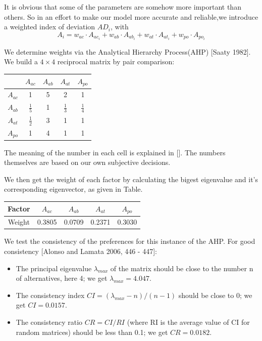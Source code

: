 \documentclass[12pt,a4paper,titlepage]{article}
\begin{document}
It is obvious that some of the parameters are somehow more important
than others. So in an effort to make our model more accurate and
reliable,we introduce a weighted index of deviation $AD_i$, with
\begin{equation}
  A_i=w_{ac} \cdot A_{ac_i} + w_{ab} \cdot A_{ab_i} + w_{at} \cdot A_{at_i} +
  w_{po} \cdot A_{po_i}
\end{equation}

We determine weights via the Analytical Hierarchy Process(AHP) [Saaty
1982]. We build a $4 \times 4$ reciprocal matrix by pair comparison:
\begin{center}
\begin{tabular}{|c|c|c|c|c|}
\hline
       &$A_{ac}$      &$A_{ab}$  &$A_{at}$    &$A_{po}$  \\ \hline
 $A_{ac}$ & 1           & 5 & 2            &1            \\ \hline
 $A_{ab}$ &$\frac{1}{5}$ & 1 &$\frac{1}{3}$ & $\frac{1}{4}$\\ \hline
 $A_{at}$ &$\frac{1}{2}$ & 3 & 1            &1            \\ \hline
 $A_{po}$ &1            & 4 & 1            &1            \\ \hline
\end{tabular}
\end{center}

The meaning of the number in each cell is explained in []. The numbers
themselves are based on our own subjective decisions.

We then get the weight of each factor by calculating the bigest
eigenvalue and it's corresponding eigenvector, as given in Table.

\begin{center}
\begin{tabular}{c|cccc}
  Factor  &$A_{ac}$    &$A_{ab}$   &$A_{at}$    &$A_{po}$\\ \hline
  Weight  &0.3805  &0.0709  &0.2371  &0.3030\\
\end{tabular}
\end{center}

We test the consistency of the preferences for this instance of the
AHP. For good consistency [Alonso and Lamata 2006, 446 - 447]:

\begin{itemize}
\item The principal eigenvalue $\lambda_{max}$ of the matrix should be
  close to the number n of alternatives, here 4; we get $\lambda_{max} = 4.047$.
\item The consistency index $CI = (\lambda_{max}-n)/(n-1)$ should be close to 0; we get $CI = 0.0157$.
\item The consistency ratio $CR = CI/RI$ (where RI is the average
  value of CI for random matrices) should be less than 0.1; we get $CR
  = 0.0182$.
\end{itemize}
\end{document}
